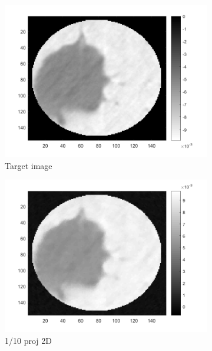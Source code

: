 \begin{figure}[ht!]
      		\begin{subfigure}[b]{0.24\textwidth}
            	\centering
            	\includegraphics[width=\textwidth]{../../data/res/target1.png}
            	\caption{Target image}    
        	\end{subfigure}
        	\begin{subfigure}[b]{0.24\textwidth}  
            	\centering 
            	\includegraphics[width=\textwidth]{../../data/res/SB_Reconstruction/2D/Target1/1_10.png}
            	\caption{1/10 proj 2D}    
            	\label{subfig:156p1L-D}
        	\end{subfigure}
        	\begin{subfigure}[b]{0.24\textwidth}  

\end{subfigure}
\end{figure}
